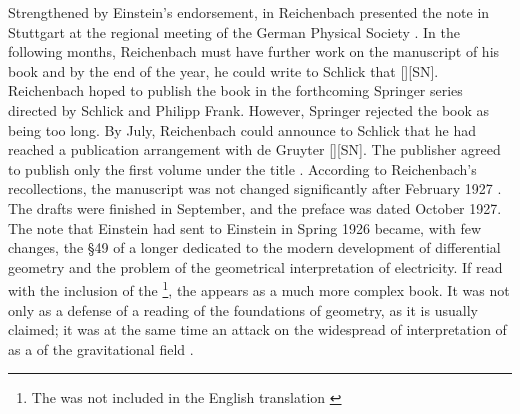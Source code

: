 \documentclass[draft]{article}
\newcommand{\PRZL}{\citetitle{Reichenbach1928}\xspace}
\newcommand{\Reich}{Reichenbach\xspace}
\begin{document}
Strengthened by Einstein's endorsement, in  Reichenbach presented the note in Stuttgart at the regional meeting of the German Physical Society \citep{Reichenbach1926d}. In the following months, Reichenbach must have further work on the manuscript of his book and by the end of the year, he could write to Schlick that  [][SN]\label{RZL1926}. Reichenbach hoped to publish the book in the forthcoming Springer series  directed by Schlick and Philipp Frank. However, Springer rejected the book as being too long. By July, Reichenbach could announce to Schlick that he had reached a publication arrangement with de Gruyter [][SN]. The publisher agreed to publish only the first volume under the title . According to \Reich's recollections, the manuscript was not changed significantly after February 1927 \citep[044-06-25]{HR}. The drafts were finished in September, and the preface was dated October 1927. The note that Einstein had sent to Einstein in Spring 1926 became, with few changes, the \S49 of a longer \Ap dedicated to the modern development of differential geometry and the problem of the geometrical interpretation of electricity. If read with the inclusion of the \Ap\footnote{The \Ap was not included in the English translation \cite{Reichenbach1958}}, the \PRZL appears as a much more complex book. It was not only as a defense of a  reading of the foundations of geometry, as it is usually claimed; it was at the same time an attack on the widespread of interpretation of \gr as a  of the gravitational field .
\end{document}
